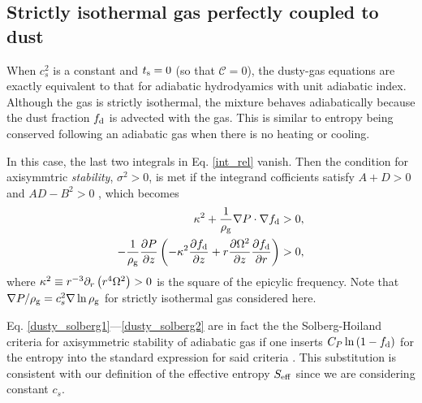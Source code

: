 \subsection{Strictly isothermal gas perfectly coupled to dust}\label{iso_perfect}
When $c_s^2$ is a constant and $t_\mathrm{s}=0$ (so that $\mathcal{C} = 0$), the dusty-gas equations are
exactly equivalent to that for adiabatic hydrodyamics with unit
adiabatic 
index. Although the gas is strictly isothermal, the mixture behaves 
adiabatically because the dust fraction $f_\mathrm{d}$ is advected with 
the gas. This is similar to entropy being conserved following an
adiabatic gas when there is no heating or cooling.  

In this case, the last two integrals in Eq. \ref{int_rel} vanish. 
Then the condition for axisymmtric \emph{stability}, $\sigma^2>0$, 
is met if the integrand cofficients satisfy $A+D>0$ and $AD-B^2>0$
\citep[][Section 11.6]{ogilvie16}, which becomes 
\begin{align}
  \kappa^2 + \frac{1}{\rho_\mathrm{g}}\nabla P \cdot\nabla f_\mathrm{d} &> 0,\label{dusty_solberg1}  \\
  -\frac{1}{\rho_\mathrm{g}}\frac{\partial P}{\partial z}\left(-\kappa^2\frac{\partial f_\mathrm{d}}{\partial
    z} + r\frac{\partial\Omega^2}{\partial z}\frac{\partial f_\mathrm{d}}{\partial r} \right) & > 0, \label{dusty_solberg2}
\end{align} 
where %
$\kappa^2 \equiv r^{-3}\partial_r\left(r^4\Omega^2\right)>0$ is the 
square of the epicylic frequency. Note that $\nabla P/\rho_\mathrm{g} =
c_s^2\nabla \ln{\rho_\mathrm{g}}$ for strictly isothermal gas considered here. 
 
Eq. \ref{dusty_solberg1}---\ref{dusty_solberg2} are in fact the 
the Solberg-Hoiland criteria for axisymmetric stability of adiabatic
gas if one inserts $C_P\ln{\left(1 -
    f_\mathrm{d}\right)}$ for the entropy into the standard
expression for said criteria \citep{tassoul78}. This substitution is
consistent with our definition of the effective entropy $S_\mathrm{eff}$ since
we are considering constant $c_s$. 

